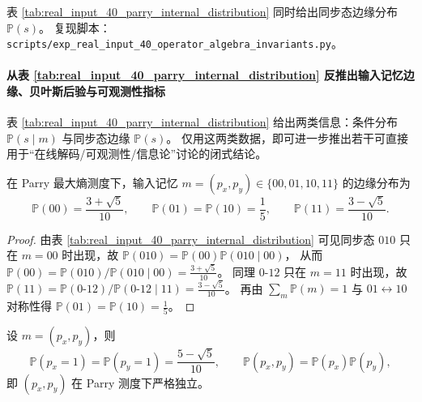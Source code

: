 \begin{remark}\label{rem:real-input-40-parry-internal-distribution-repro}
表 \ref{tab:real_input_40_parry_internal_distribution} 同时给出同步态边缘分布 $\mathbb{P}(s)$。
复现脚本：\texttt{scripts/exp\_real\_input\_40\_operator\_algebra\_invariants.py}。
\end{remark}


\paragraph{从表 \ref{tab:real_input_40_parry_internal_distribution} 反推出输入记忆边缘、贝叶斯后验与可观测性指标}
表 \ref{tab:real_input_40_parry_internal_distribution} 给出两类信息：条件分布 $\mathbb{P}(s\mid m)$ 与同步态边缘 $\mathbb{P}(s)$。
仅用这两类数据，即可进一步推出若干可直接用于“在线解码/可观测性/信息论”讨论的闭式结论。

\begin{proposition}[输入记忆边缘分布的闭式反推]\label{prop:real-input-40-memory-marginal}
在 Parry 最大熵测度下，输入记忆 $m=(p_x,p_y)\in\{00,01,10,11\}$ 的边缘分布为
\[
\mathbb{P}(00)=\frac{3+\sqrt5}{10},\qquad
\mathbb{P}(01)=\mathbb{P}(10)=\frac15,\qquad
\mathbb{P}(11)=\frac{3-\sqrt5}{10}.
\]
\end{proposition}

\begin{proof}
由表 \ref{tab:real_input_40_parry_internal_distribution} 可见同步态 $010$ 只在 $m=00$ 时出现，故
\(
\mathbb{P}(010)=\mathbb{P}(00)\mathbb{P}(010\mid 00)
\)，
从而
\(
\mathbb{P}(00)=\mathbb{P}(010)/\mathbb{P}(010\mid 00)=\frac{3+\sqrt5}{10}
\)。
同理 $0$-$12$ 只在 $m=11$ 时出现，故
\(
\mathbb{P}(11)=\mathbb{P}(0\text{-}12)/\mathbb{P}(0\text{-}12\mid 11)=\frac{3-\sqrt5}{10}
\)。
再由 $\sum_m \mathbb{P}(m)=1$ 与 $01\leftrightarrow 10$ 对称性得 $\mathbb{P}(01)=\mathbb{P}(10)=\frac15$。
\end{proof}

\begin{corollary}\label{cor:real-input-40-memory-independence}
设 $m=(p_x,p_y)$，则
\[
\mathbb{P}(p_x=1)=\mathbb{P}(p_y=1)=\frac{5-\sqrt5}{10},
\qquad
\mathbb{P}(p_x,p_y)=\mathbb{P}(p_x)\mathbb{P}(p_y),
\]
即 $(p_x,p_y)$ 在 Parry 测度下严格独立。
\end{corollary}

